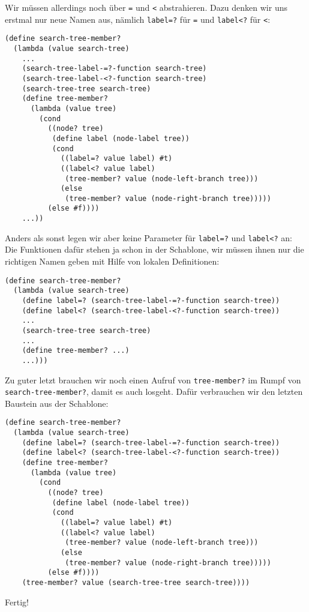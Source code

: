 %
Wir müssen allerdings noch über \lstinline{=} und \lstinline{<}
abstrahieren.  Dazu denken wir uns erstmal nur neue Namen aus, nämlich
\lstinline{label=?} für \lstinline{=} und \lstinline{label<?} für \lstinline{<}:
%
\begin{lstlisting}
(define search-tree-member?
  (lambda (value search-tree)
    ...
    (search-tree-label-=?-function search-tree)
    (search-tree-label-<?-function search-tree)
    (search-tree-tree search-tree)
    (define tree-member?
      (lambda (value tree)
        (cond
          ((node? tree)
           (define label (node-label tree))
           (cond
             ((label=? value label) #t)
             ((label<? value label)
              (tree-member? value (node-left-branch tree)))
             (else
              (tree-member? value (node-right-branch tree)))))
          (else #f))))
    ...))
\end{lstlisting}
%
Anders als sonst legen wir aber keine Parameter für
\lstinline{label=?} und \lstinline{label<?} an: Die Funktionen
dafür stehen ja schon in der Schablone, wir müssen ihnen nur die
richtigen Namen geben mit Hilfe von lokalen Definitionen:
%
\begin{lstlisting}
(define search-tree-member?
  (lambda (value search-tree)
    (define label=? (search-tree-label-=?-function search-tree))
    (define label<? (search-tree-label-<?-function search-tree))
    ...
    (search-tree-tree search-tree)
    ...
    (define tree-member? ...)
    ...)))
\end{lstlisting}
%
Zu guter letzt brauchen wir noch einen Aufruf von \lstinline{tree-member?}
im Rumpf von \lstinline{search-tree-member?}, damit es auch losgeht.
Dafür verbrauchen wir den letzten Baustein aus der Schablone:
%
\begin{lstlisting}
(define search-tree-member?
  (lambda (value search-tree)
    (define label=? (search-tree-label-=?-function search-tree))
    (define label<? (search-tree-label-<?-function search-tree))
    (define tree-member?
      (lambda (value tree)
        (cond
          ((node? tree)
           (define label (node-label tree))
           (cond
             ((label=? value label) #t)
             ((label<? value label)
              (tree-member? value (node-left-branch tree)))
             (else
              (tree-member? value (node-right-branch tree)))))
          (else #f))))
    (tree-member? value (search-tree-tree search-tree))))
\end{lstlisting}
%
Fertig!

